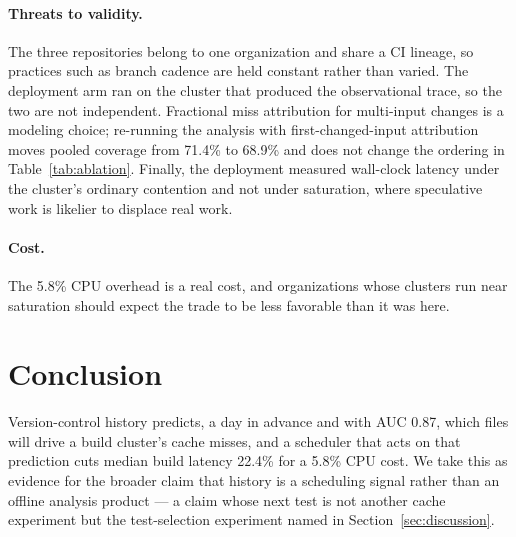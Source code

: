 \documentclass{anvil-paper}
\begin{document}
\paragraph{Threats to validity.}
The three repositories belong to one organization and share a CI lineage, so
practices such as branch cadence are held constant rather than varied. The
deployment arm ran on the cluster that produced the observational trace, so
the two are not independent. Fractional miss attribution for multi-input
changes is a modeling choice; re-running the analysis with
first-changed-input attribution moves pooled coverage from 71.4\% to 68.9\%
and does not change the ordering in Table~\ref{tab:ablation}. Finally, the
deployment measured wall-clock latency under the cluster's ordinary contention
and not under saturation, where speculative work is likelier to displace real
work.

\paragraph{Cost.}
The 5.8\% CPU overhead is a real cost, and organizations whose clusters run
near saturation should expect the trade to be less favorable than it was here.

\section{Conclusion}
\label{sec:conclusion}

Version-control history predicts, a day in advance and with AUC 0.87, which
files will drive a build cluster's cache misses, and a scheduler that acts on
that prediction cuts median build latency 22.4\% for a 5.8\% CPU cost. We take
this as evidence for the broader claim that history is a scheduling signal
rather than an offline analysis product --- a claim whose next test is not
another cache experiment but the test-selection experiment named in
Section~\ref{sec:discussion}.



\end{document}
